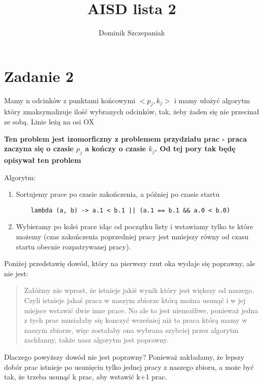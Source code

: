 \documentclass[12pt]{article}
\title{AISD lista 2}
\author{Dominik Szczepaniak}
\begin{document}
\maketitle

\bgroup\obeylines


\section{Zadanie 2}
Mamy n odcinków z punktami końcowymi $<p_j, k_j>$ i mamy ułożyć algorytm który zmaksymalizuje ilość wybranych odcinków, tak, żeby żaden się nie przecinał ze sobą.
Linie leżą na osi OX

\textbf{Ten problem jest izomorficzny z problemem przydziału prac - praca zaczyna się o czasie $p_j$ a kończy o czasie $k_j$. Od tej pory tak będę opisywał ten problem}

Algorytm:
\begin{enumerate}
\item Sortujemy prace po czasie zakończenia, a później po czasie startu 
\begin{lstlisting}
    lambda (a, b) -> a.1 < b.1 || (a.1 == b.1 && a.0 < b.0)    
\end{lstlisting}
\item Wybieramy po kolei prace idąc od początku listy i wstawiamy tylko te które możemy (czas zakończenia poprzedniej pracy jest mniejszy równy od czasu startu obecnie rozpatrywanej pracy).
\end{enumerate}

Poniżej przedstawię dowód, który na pierwszy rzut oka wydaje się poprawny, ale nie jest:
\begin{quote}
Załóżmy nie wprost, że istnieje jakiś wynik który jest większy od naszego. Czyli istnieje jakaś praca w naszym zbiorze którą można usunąć i w jej miejsce wstawić dwie inne prace. 
No ale to jest niemożliwe, ponieważ jedna z tych prac musiałaby się konczyć wcześniej niż ta praca którą mamy w naszym zbiorze, więc zostałaby ona wybrana szybciej przez algorytm zachłanny, także nasz algorytm jest poprawny.
\end{quote}

Dlaczego powyższy dowód nie jest poprawny? Ponieważ zakładamy, że lepszy dobór prac istnieje po usunięciu tylko jednej pracy z naszego zbioru, a może być tak, że trzeba usunąć k prac, aby wstawić k+1 prac.
\end{document}
